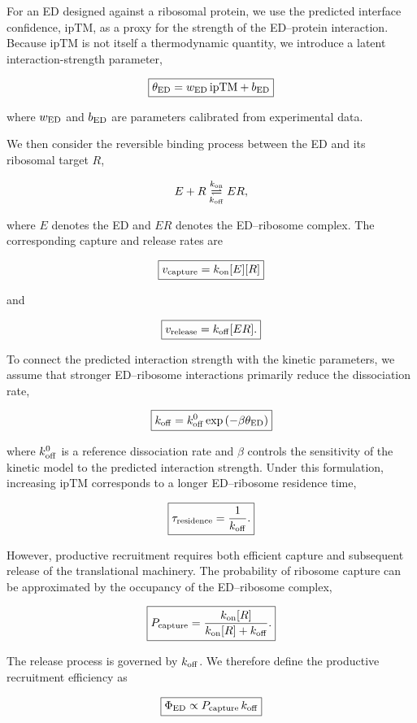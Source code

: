\documentclass{article}
\begin{document}
For an ED designed against a ribosomal protein, we use the predicted interface confidence, \(\mathrm{ipTM}\), as a proxy for the strength of the ED--protein interaction. Because \(\mathrm{ipTM}\) is not itself a thermodynamic quantity, we introduce a latent interaction-strength parameter,

\[
\boxed{
\theta_{\rm ED}
=
w_{\rm ED}\,\mathrm{ipTM}
+
b_{\rm ED}
}
\]

where \(w_{\rm ED}\) and \(b_{\rm ED}\) are parameters calibrated from experimental data.

We then consider the reversible binding process between the ED and its ribosomal target \(R\),

\[
E+R
\underset{k_{\rm off}}{\overset{k_{\rm on}}{\rightleftharpoons}}
ER,
\]

where \(E\) denotes the ED and \(ER\) denotes the ED--ribosome complex. The corresponding capture and release rates are

\[
\boxed{
v_{\rm capture}
=
k_{\rm on}[E][R]
}
\]

and

\[
\boxed{
v_{\rm release}
=
k_{\rm off}[ER].
}
\]

To connect the predicted interaction strength with the kinetic parameters, we assume that stronger ED--ribosome interactions primarily reduce the dissociation rate,

\[
\boxed{
k_{\rm off}
=
k_{\rm off}^{0}
\exp\left(
-\beta\theta_{\rm ED}
\right)
}
\]

where \(k_{\rm off}^{0}\) is a reference dissociation rate and \(\beta\) controls the sensitivity of the kinetic model to the predicted interaction strength. Under this formulation, increasing \(\mathrm{ipTM}\) corresponds to a longer ED--ribosome residence time,

\[
\boxed{
\tau_{\rm residence}
=
\frac{1}{k_{\rm off}}.
}
\]

However, productive recruitment requires both efficient capture and subsequent release of the translational machinery. The probability of ribosome capture can be approximated by the occupancy of the ED--ribosome complex,

\[
\boxed{
P_{\rm capture}
=
\frac{
k_{\rm on}[R]
}{
k_{\rm on}[R]+k_{\rm off}
}.
}
\]

The release process is governed by \(k_{\rm off}\). We therefore define the productive recruitment efficiency as

\[
\boxed{
\Phi_{\rm ED}
\propto
P_{\rm capture}\,k_{\rm off}
}
\]
\end{document}
